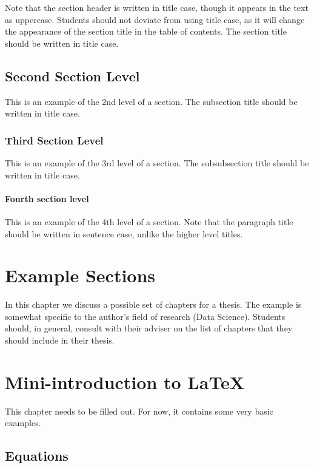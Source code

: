 Note that the section header is written in title case, though it appears in the text as uppercase. Students should not deviate from using title case, as it will change the appearance of the section title in the table of contents. The section title should be written in title case.

\subsection{Second Section Level}
This is an example of the 2nd level of a section. The subsection title should be written in title case.

\subsubsection{Third Section Level}
This is an example of the 3rd level of a section. The subsubsection title should be written in title case.

\paragraph{Fourth section level}
This is an example of the 4th level of a section. Note that the paragraph title should be written in sentence case, unlike the higher level titles.


\section{Example Sections}\label{sec:example_sections}

In this chapter we discuss a possible set of chapters for a thesis. The example is somewhat specific to the author's field of research (Data Science). Students should, in general, consult with their adviser on the list of chapters that they should include in their thesis.


\section{Mini-introduction to LaTeX}\label{sec:latex}

This chapter needs to be filled out. For now, it contains some very basic examples.


\subsection{Equations}\label{sec:latex:equations}

